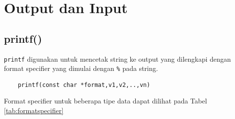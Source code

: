 \section{Output dan Input}

\subsection{printf()}
\verb*|printf|  digunakan untuk mencetak string  ke output yang dilengkapi dengan format specifier yang dimulai dengan \verb*|%| pada string.

\begin{verbatim}
	printf(const char *format,v1,v2,..,vn)
\end{verbatim}

Format specifier untuk beberapa tipe data dapat dilihat pada Tabel \ref{tab:formatspecifier}


